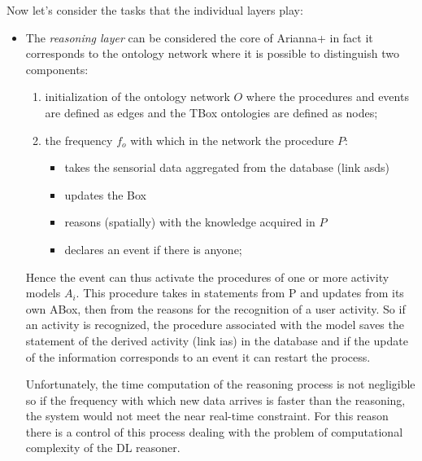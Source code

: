\documentclass{thesisreport}
\begin{document}
 Now let's consider the tasks that the individual layers play:
 \begin{itemize}
     \item The \textit{reasoning layer} can be considered the core of Arianna+ in fact it corresponds to the ontology network where it is possible to distinguish two components:
     \begin{enumerate}
         \item initialization of the ontology network $O$ where the procedures and events are defined as edges and the TBox ontologies are defined as nodes;
         \item the frequency $f_o$ with which in the network the procedure $P$:
         \begin{itemize}
             \item takes the sensorial data aggregated from the database (link asds)
             \item updates the Box
             \item reasons (spatially) with the knowledge acquired in $P$
             \item declares an event if there is anyone;
         \end{itemize}
     \end{enumerate}
     Hence the event can thus activate the procedures of one or more activity models $A_i$. This procedure takes in statements from P and updates from its own ABox, then from the reasons for the recognition of a user activity.
     So if an activity is recognized, the procedure associated with the model saves the statement of the derived activity (link ias) in the database and if the update of the information corresponds to an event it can restart the process.
     
     Unfortunately, the time computation of the reasoning process is not negligible so if the frequency with which new data arrives is faster than the reasoning, the system would not meet the near real-time constraint.
     For this reason there is a control of this process dealing with the problem of computational complexity of the DL reasoner.
     

\end{itemize}
\end{document}
